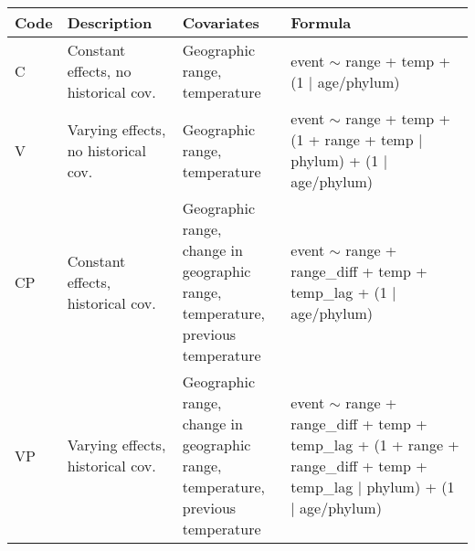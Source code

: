 \documentclass[12pt,letterpaper]{article}
\begin{document}
{
  \def\arraystretch{1.5}
  \begin{tabular}[ht]{ l p{3cm} l l }
    Code & Description & Covariates & Formula \\
    \hline
    C & Constant effects, no historical cov. & \parbox[t]{0.25\textwidth}{Geographic range,\\temperature} & \parbox[t]{0.33\textwidth}{event $\sim$ range + temp +\\(1 $|$ age/phylum)} \\
    V & Varying effects, no historical cov. & \parbox[t]{0.25\textwidth}{Geographic range,\\temperature} & \parbox[t]{0.33\textwidth}{event $\sim$ range + temp +\\(1 + range + temp $|$ phylum) +\\(1 $|$ age/phylum)} \\ 
    CP & Constant effects, historical cov. & \parbox[t]{0.25\textwidth}{Geographic range,\\change in geographic range,\\temperature,\\previous temperature} & \parbox[t]{0.33\textwidth}{event $\sim$ range + range\_diff +\\temp + temp\_lag +\\(1 $|$ age/phylum)} \\
    VP & Varying effects, historical cov. & \parbox[t]{0.25\textwidth}{Geographic range,\\change in geographic range,\\temperature,\\previous temperature} & \parbox[t]{0.33\textwidth}{event $\sim$ range + range\_diff +\\temp + temp\_lag +\\(1 + range + range\_diff + temp + temp\_lag $|$ phylum) +\\(1 $|$ age/phylum)} \\
  \end{tabular}
}
\end{document}

